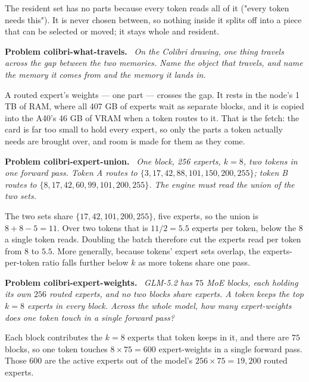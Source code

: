 \documentclass[11pt]{article}
\newenvironment{problem}[1]
  {\par\medskip\noindent\textbf{Problem #1.}\ \itshape}
  {\par\medskip}
\begin{document}
The resident set has no parts because every token reads all of it ("every token needs this"). It is never chosen between, so nothing inside it splits off into a piece that can be selected or moved; it stays whole and resident.

\begin{problem}{colibri-what-travels}
On the Colibri drawing, one thing travels across the gap between the two memories. Name the object that travels, and name the memory it comes from and the memory it lands in.
\end{problem}
A routed expert's weights --- one part --- crosses the gap. It rests in the node's 1 TB of RAM, where all 407 GB of experts wait as separate blocks, and it is copied into the A40's 46 GB of VRAM when a token routes to it. That is the fetch: the card is far too small to hold every expert, so only the parts a token actually needs are brought over, and room is made for them as they come.

\begin{problem}{colibri-expert-union}
One block, 256 experts, $k=8$, two tokens in one forward pass. Token A routes to $\{3,17,42,88,101,150,200,255\}$; token B routes to $\{8,17,42,60,99,101,200,255\}$. The engine must read the union of the two sets.
\end{problem}
The two sets share $\{17,42,101,200,255\}$, five experts, so the union is $8+8-5=11$. Over two tokens that is $11/2=5.5$ experts per token, below the $8$ a single token reads. Doubling the batch therefore cut the experts read per token from $8$ to $5.5$. More generally, because tokens' expert sets overlap, the experts-per-token ratio falls further below $k$ as more tokens share one pass.

\begin{problem}{colibri-expert-weights}
GLM-5.2 has $75$ MoE blocks, each holding its own $256$ routed experts, and no two blocks share experts. A token keeps the top $k=8$ experts in every block. Across the whole model, how many expert-weights does one token touch in a single forward pass?
\end{problem}
Each block contributes the $k=8$ experts that token keeps in it, and there are $75$ blocks, so one token touches $8\times75=600$ expert-weights in a single forward pass. Those $600$ are the active experts out of the model's $256\times75=19{,}200$ routed experts.
\end{document}
